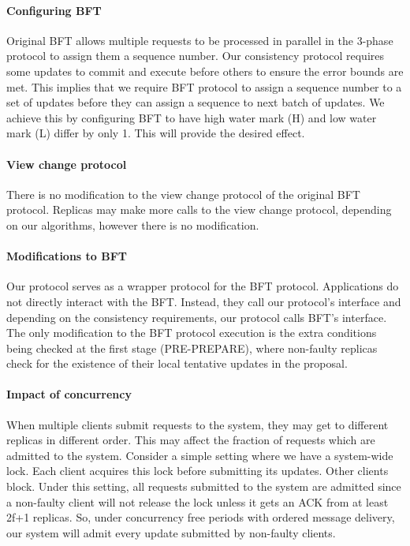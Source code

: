 \documentclass[twocolumn,10pt]{article}
\begin{document}
{\paragraph{Configuring BFT} Original BFT allows multiple requests to be 
processed in parallel in the 3-phase protocol to assign them a sequence number.
Our consistency protocol requires some updates to commit and execute before
others to ensure the error bounds are met. This implies that we require BFT
protocol to assign a sequence number to a set of updates before they can 
assign a sequence to next batch of updates. We achieve this by configuring
BFT to have high water mark (H) and low water mark (L) differ by only 1. 
This will provide the desired effect.

\paragraph{View change protocol} There is no modification to the view
change protocol of the original BFT protocol. Replicas may make
more calls to the view change protocol, depending on our algorithms, however
there is no modification.

\paragraph{Modifications to BFT} Our protocol serves as a wrapper protocol
for the BFT protocol. Applications do not directly interact with the BFT.
Instead, they call our protocol's interface and depending on the consistency
requirements, our protocol calls BFT's interface. The only modification to
the BFT protocol execution is the extra conditions being checked at the first
stage (PRE-PREPARE), where non-faulty replicas check for the existence of 
their local tentative updates in the proposal.


\paragraph{Impact of concurrency} 
When multiple clients submit requests to the system, they may get to 
different replicas in different order. This may affect the fraction of
requests which are admitted to the system. Consider a simple setting where
we have a system-wide lock. Each client acquires this lock before submitting
its updates. Other clients block. Under this setting, all requests submitted
to the system are admitted since a non-faulty client will not release
the lock unless it gets an ACK from at least 2f+1 replicas. So, under concurrency
free periods with ordered message delivery, our system will admit every update
submitted by non-faulty clients.

}
\end{document}
